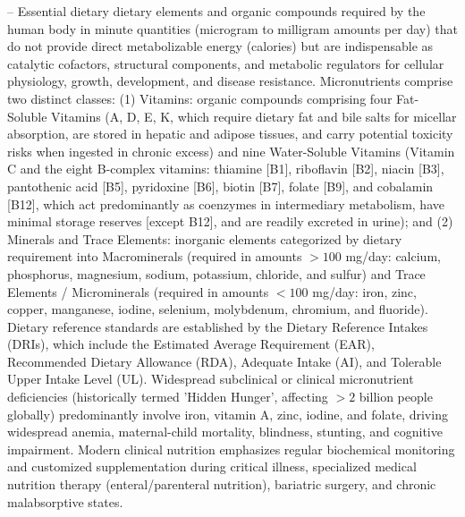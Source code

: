 -- Essential dietary dietary elements and organic compounds required by the human body in minute quantities (microgram to milligram amounts per day) that do not provide direct metabolizable energy (calories) but are indispensable as catalytic cofactors, structural components, and metabolic regulators for cellular physiology, growth, development, and disease resistance. Micronutrients comprise two distinct classes: (1) Vitamins: organic compounds comprising four Fat-Soluble Vitamins (A, D, E, K, which require dietary fat and bile salts for micellar absorption, are stored in hepatic and adipose tissues, and carry potential toxicity risks when ingested in chronic excess) and nine Water-Soluble Vitamins (Vitamin C and the eight B-complex vitamins: thiamine [B1], riboflavin [B2], niacin [B3], pantothenic acid [B5], pyridoxine [B6], biotin [B7], folate [B9], and cobalamin [B12], which act predominantly as coenzymes in intermediary metabolism, have minimal storage reserves [except B12], and are readily excreted in urine); and (2) Minerals and Trace Elements: inorganic elements categorized by dietary requirement into Macrominerals (required in amounts $>100$ mg/day: calcium, phosphorus, magnesium, sodium, potassium, chloride, and sulfur) and Trace Elements / Microminerals (required in amounts $<100$ mg/day: iron, zinc, copper, manganese, iodine, selenium, molybdenum, chromium, and fluoride). Dietary reference standards are established by the Dietary Reference Intakes (DRIs), which include the Estimated Average Requirement (EAR), Recommended Dietary Allowance (RDA), Adequate Intake (AI), and Tolerable Upper Intake Level (UL). Widespread subclinical or clinical micronutrient deficiencies (historically termed 'Hidden Hunger', affecting $>2$ billion people globally) predominantly involve iron, vitamin A, zinc, iodine, and folate, driving widespread anemia, maternal-child mortality, blindness, stunting, and cognitive impairment. Modern clinical nutrition emphasizes regular biochemical monitoring and customized supplementation during critical illness, specialized medical nutrition therapy (enteral/parenteral nutrition), bariatric surgery, and chronic malabsorptive states.

